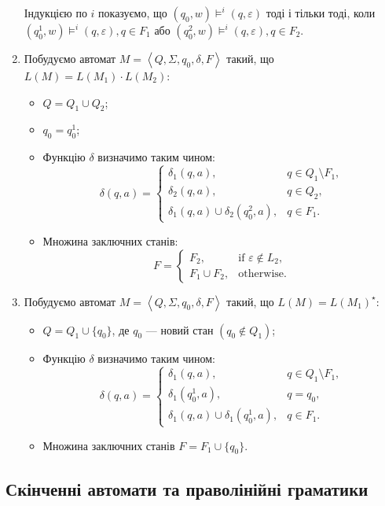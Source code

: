 \begin{enumerate}
	Індукцією по $i$ показуємо, що $(q_0, w) \models^i (q,\varepsilon)$ тоді і тільки тоді, коли $(q_0^1,w) \models^i (q,\varepsilon), q \in F_1$ або $(q_0^2,w) \models^i (q,\varepsilon), q \in F_2$.
	\item Побудуємо автомат $M = \left\langle Q, \Sigma, q_0, \delta, F \right\rangle$ такий, що $L(M) = L(M_1) \cdot L(M_2)$:
	\begin{itemize}
		\item $Q = Q_1 \cup Q_2$;
		\item $q_0 = q_0^1$;
		\item Функцію $\delta$ визначимо таким чином:
		\[
		\delta(q, a) = \begin{cases}
		\delta_1(q, a), & q \in Q_1 \setminus F_1, \\
		\delta_2(q, a), & q \in Q_2, \\
		\delta_1(q, a) \cup \delta_2(q_0^2,a), & q \in F_1.
		\end{cases}
		\]
		\item Множина заключних станів:
		\[
		F = \begin{cases}
		F_2, & \text{if } \varepsilon \notin L_2, \\
		F_1 \cup F_2, & \text{otherwise}.
		\end{cases}
		\]
	\end{itemize}
	\item Побудуємо автомат $M = \left\langle Q, \Sigma, q_0, \delta, F \right\rangle$ такий, що $L(M) = L(M_1)^\star$:
	\begin{itemize}
		\item $Q = Q_1 \cup \{q_0\}$, де $q_0$ --- новий стан $(q_0 \notin Q_1)$;
		\item Функцію $\delta$ визначимо таким чином:
		\[
		\delta (q, a) = \begin{cases}
		\delta_1(q, a), & q \in Q_1 \setminus F_1, \\
		\delta_1(q_0^1, a), & q = q_0, \\
		\delta_1(q, a) \cup \delta_1(q_0^1, a), & q \in F_1.
		\end{cases}
		\]
		\item Множина заключних станів $F = F_1 \cup \{q_0\}$.
	\end{itemize}
\end{enumerate}

\subsection{Скінченні автомати та праволінійні граматики}

